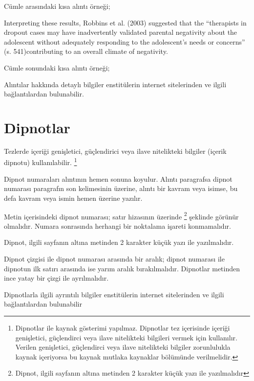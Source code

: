Cümle arasındaki kısa alıntı örneği;

Interpreting these results, Robbins et al. (2003) suggested that the “therapists in dropout cases may have inadvertently validated parental negativity about the adolescent without adequately responding to the adolescent’s needs or concerns” (s. 541)contributing to an overall climate of negativity.

Cümle sonundaki kısa alıntı örneği;


Alıntılar hakkında detaylı bilgiler enstitülerin internet sitelerinden ve ilgili bağlantılardan bulunabilir.

\section{Dipnotlar}

Tezlerde içeriği genişletici, güçlendirici veya ilave nitelikteki bilgiler (içerik dipnotu) kullanılabilir. \footnote{Dipnotlar ile kaynak gösterimi yapılmaz. Dipnotlar tez içerisinde içeriği genişletici, güçlendirci veya ilave nitelikteki bilgileri vermek için kullanılır. Verilen genişletici, güçlendirci veya ilave nitelikteki bilgiler zorunlulukla kaynak içeriyorsa bu kaynak mutlaka kaynaklar bölümünde verilmelidir.}

Dipnot numaraları alıntının hemen sonuna koyulur. Alıntı paragrafsa dipnot numarası paragrafın son kelimesinin üzerine, alıntı bir kavram veya isimse, bu defa kavram veya ismin hemen üzerine yazılır. 

Metin içerisindeki dipnot numarası; satır hizasının üzerinde \footnote{Dipnot, ilgili sayfanın altına metinden 2 karakter küçük yazı ile yazılmalıdır} şeklinde görünür olmalıdır. Numara sonrasında herhangi bir noktalama işareti konmamalıdır.

Dipnot, ilgili sayfanın altına metinden 2 karakter küçük yazı ile yazılmalıdır. 

Dipnot çizgisi ile dipnot numarası arasında bir aralık; dipnot numarası ile dipnotun ilk satırı arasında ise yarım aralık bırakılmalıdır. Dipnotlar metinden ince yatay bir çizgi ile ayrılmalıdır.

Dipnotlarla ilgili ayrıntılı bilgiler enstitülerin internet sitelerinden ve ilgili bağlantılardan bulunabilir

